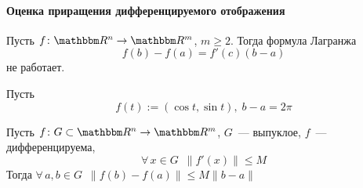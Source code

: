 \documentclass[12pt,timbord]{../../../notes}
\begin{document}
\paragraph{Оценка приращения дифференцируемого отображения}
\label{par:diffspace::diffestim}

\begin{prop}\label{prop:diffspace::diffestim::lagrfail}
  Пусть $f\colon \R^n \to \R^m$, $m \geqslant 2$. Тогда формула Лагранжа
  \[
    f(b) - f(a) = f'(c)(b - a)
  \]
  не работает.
\end{prop}
\begin{exmp*}\label{exmp:diffspace::diffestim::lagrfail}
  Пусть 
  \[
    f(t) := (\cos t, \sin t),\; b - a = 2\pi
  \]
\end{exmp*}

\begin{thrm}\label{thrm:diffspace::diffestim::diffestim}
  Пусть $f\colon G \subset \R^n \to \R^m$, $G$~--- выпуклое, $f$~--- дифференцируема, 
  \[ 
    \forall\, x \in G \;\: \| f'(x) \| \leqslant M 
  \]
  Тогда $\forall\, a,b \in G \;\: \|f(b) - f(a)\| \leqslant M \| b-a \|$
\end{thrm}
\end{document}
